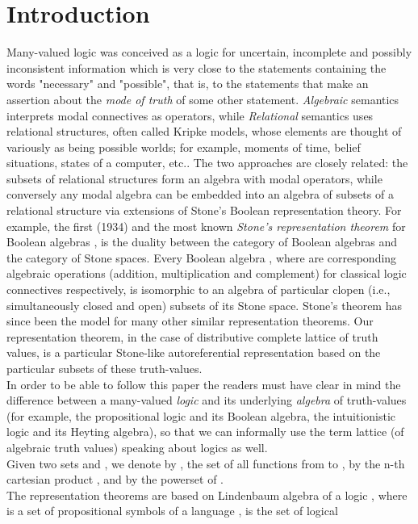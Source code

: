 \documentclass[10pt,twocolumn]{article}
\begin{document}
\section{Introduction}
Many-valued logic was conceived as a logic for uncertain, incomplete
and possibly inconsistent information which is very close to the
statements containing the words "necessary" and "possible", that is,
to the statements that make an assertion about the \emph{mode of
truth} of some other statement. \emph{Algebraic} semantics
interprets modal connectives as operators,
 while \emph{Relational} semantics uses
relational structures, often called Kripke models, whose elements
are thought of variously as being possible worlds; for example,
moments of time, belief situations, states of a computer, etc.. The
two approaches are closely related: the subsets of relational
structures form an algebra with modal operators, while conversely
any modal algebra can be embedded into an algebra of subsets of a
relational structure via extensions of Stone's Boolean
representation theory. For example, the first (1934) and the most
known \emph{Stone's representation theorem} for Boolean algebras
\cite{John82},  is the duality between the category of Boolean
algebras and the category of Stone spaces. Every Boolean algebra
, where  are
corresponding algebraic operations (addition, multiplication and
complement) for classical logic connectives 
respectively, is isomorphic to an algebra of particular clopen
(i.e., simultaneously closed and open) subsets of its Stone space.
Stone's theorem has since been the model for many other similar
representation theorems. Our representation theorem, in the case of
distributive complete lattice of truth values, is a particular
Stone-like autoreferential representation
based on the particular subsets of these truth-values.\\
In order to be able to follow this paper  the readers must have
clear in mind the difference between a many-valued \emph{logic} and
its underlying \emph{algebra} of truth-values (for example, the
propositional logic and its Boolean algebra, the intuitionistic
logic and its Heyting algebra), so that we can informally use the
term lattice (of algebraic truth values) speaking about logics as
well.\\ Given two sets  and , we  denote by  , the set of
all functions from  to ,  by  the n-th cartesian product
, and by  the powerset of .\\
The representation theorems are based on Lindenbaum algebra of a
logic , where  is a set of
propositional symbols of a language ,  is the set of logical
\end{document}
